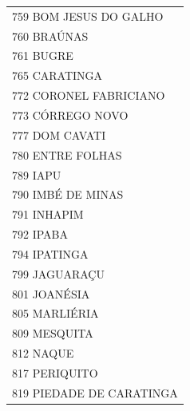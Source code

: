 \documentclass{article}
\begin{document}
\begin{longtable}[c]{m{18cm}}
\multicolumn{1}{l}{ \hspace{2em} 759 BOM JESUS DO GALHO } \\
\multicolumn{1}{l}{ \hspace{2em} 760 BRAÚNAS } \\
\multicolumn{1}{l}{ \hspace{2em} 761 BUGRE } \\
\multicolumn{1}{l}{ \hspace{2em} 765 CARATINGA } \\
\multicolumn{1}{l}{ \hspace{2em} 772 CORONEL FABRICIANO } \\
\multicolumn{1}{l}{ \hspace{2em} 773 CÓRREGO NOVO } \\
\multicolumn{1}{l}{ \hspace{2em} 777 DOM CAVATI } \\
\multicolumn{1}{l}{ \hspace{2em} 780 ENTRE FOLHAS } \\
\multicolumn{1}{l}{ \hspace{2em} 789 IAPU } \\
\multicolumn{1}{l}{ \hspace{2em} 790 IMBÉ DE MINAS } \\
\multicolumn{1}{l}{ \hspace{2em} 791 INHAPIM } \\
\multicolumn{1}{l}{ \hspace{2em} 792 IPABA } \\
\multicolumn{1}{l}{ \hspace{2em} 794 IPATINGA } \\
\multicolumn{1}{l}{ \hspace{2em} 799 JAGUARAÇU } \\
\multicolumn{1}{l}{ \hspace{2em} 801 JOANÉSIA } \\
\multicolumn{1}{l}{ \hspace{2em} 805 MARLIÉRIA } \\
\multicolumn{1}{l}{ \hspace{2em} 809 MESQUITA } \\
\multicolumn{1}{l}{ \hspace{2em} 812 NAQUE } \\
\multicolumn{1}{l}{ \hspace{2em} 817 PERIQUITO } \\
\multicolumn{1}{l}{ \hspace{2em} 819 PIEDADE DE CARATINGA } \\

\end{longtable}
\end{document}
